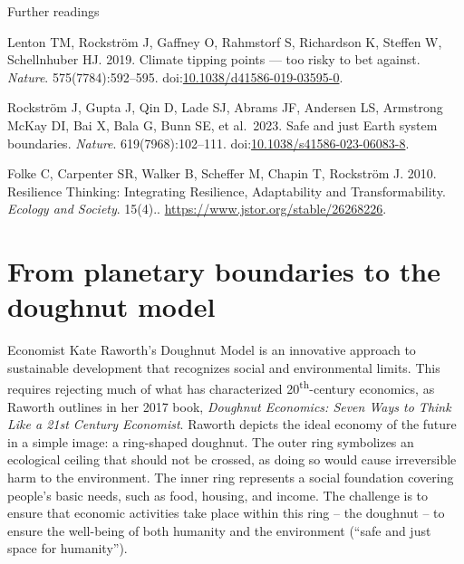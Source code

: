 \documentclass[
  a4paper,
  openany]{book}
\begin{document}
Further readings

Lenton TM, Rockström J, Gaffney O, Rahmstorf S, Richardson K, Steffen W,
Schellnhuber HJ. 2019. Climate tipping points --- too risky to bet
against. \emph{Nature}. 575(7784):592--595.
doi:\href{https://doi.org/10.1038/d41586-019-03595-0}{10.1038/d41586-019-03595-0}.

Rockström J, Gupta J, Qin D, Lade SJ, Abrams JF, Andersen LS, Armstrong
McKay DI, Bai X, Bala G, Bunn SE, et al.~2023. Safe and just Earth
system boundaries. \emph{Nature}. 619(7968):102--111.
doi:\href{https://doi.org/10.1038/s41586-023-06083-8}{10.1038/s41586-023-06083-8}.

Folke C, Carpenter SR, Walker B, Scheffer M, Chapin T, Rockström J.
2010. Resilience Thinking: Integrating Resilience, Adaptability and
Transformability. \emph{Ecology and Society}. 15(4)..
\url{https://www.jstor.org/stable/26268226}.

\section{From planetary boundaries to the doughnut
model}\label{from-planetary-boundaries-to-the-doughnut-model}

Economist Kate Raworth's Doughnut Model is an innovative approach to
sustainable development that recognizes social and environmental limits.
This requires rejecting much of what has characterized
20\textsuperscript{th}-century economics, as Raworth outlines in her
2017 book, \emph{Doughnut Economics: Seven Ways to Think Like a 21st
Century Economist}. Raworth depicts the ideal economy of the future in a
simple image: a ring-shaped doughnut. The outer ring symbolizes an
ecological ceiling that should not be crossed, as doing so would cause
irreversible harm to the environment. The inner ring represents a social
foundation covering people's basic needs, such as food, housing, and
income. The challenge is to ensure that economic activities take place
within this ring -- the doughnut -- to ensure the well-being of both
humanity and the environment (``safe and just space for humanity'').
\end{document}
